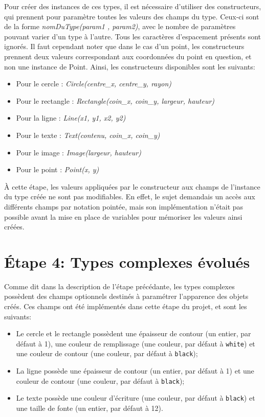 \documentclass[a4paper, 12pt]{report}
\begin{document}
	Pour créer des instances de ces types, il est nécessaire d'utiliser des constructeurs, qui prennent pour paramètre toutes les valeurs des champs du type. Ceux-ci sont de la forme \textit{nomDuType(param1 , param2)}, avec le nombre de paramètres pouvant varier d'un type à l'autre. Tous les caractères d'espacement présents sont ignorés. Il faut cependant noter que dans le cas d'un point, les constructeurs prennent deux valeurs correspondant aux coordonnées du point en question, et non une instance de Point. Ainsi, les constructeurs disponibles sont les suivants:\\
	
	\begin{itemize}
		\item Pour le cercle : \textit{Circle(centre\_x, centre\_y, rayon)}
		\item Pour le rectangle : \textit{Rectangle(coin\_x, coin\_y, largeur, hauteur)}
		\item Pour la ligne : \textit{Line(x1, y1, x2, y2)}
		\item Pour le texte : \textit{Text(contenu, coin\_x, coin\_y)}
		\item Pour le image : \textit{Image(largeur, hauteur)}
		\item Pour le point : \textit{Point(x, y)}\\
	\end{itemize}
	
	\`A cette étape, les valeurs appliquées par le constructeur aux champs de l'instance du type créée ne sont pas modifiables. En effet, le sujet demandais un accès aux différents champs par notation pointée, mais son implémentation n'était pas possible avant la mise en place de variables pour mémoriser les valeurs ainsi créées.
        
\chapter{\'Etape 4: Types complexes évolués}

	Comme dit dans la description de l'étape précédante, les types complexes possèdent des champs optionnels destinés à paramétrer l'apparence des objets créés. Ces champs ont été implémentés dans cette étape du projet, et sont les suivants:\\
	
	\begin{itemize}
		\item Le cercle et le rectangle possèdent une épaisseur de contour (un entier, par défaut à 1), une couleur de remplissage (une couleur, par défaut à \texttt{white}) et une couleur de contour (une couleur, par défaut à \texttt{black});
		\item La ligne possède une épaisseur de contour (un entier, par défaut à 1) et une couleur de contour (une couleur, par défaut à \texttt{black});
		\item Le texte possède une couleur d'écriture (une couleur, par défaut à \texttt{black}) et une taille de fonte (un entier, par défaut à 12).\\
	\end{itemize}
	
\end{document}
